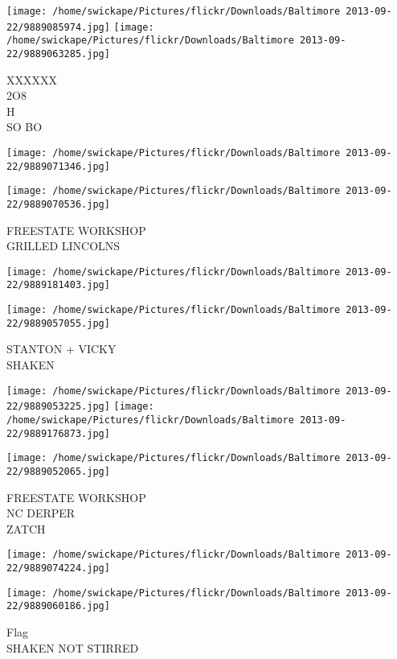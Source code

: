\documentclass[10pt,letterpaper]{article}
\begin{document}
\texttt{[image: /home/swickape/Pictures/flickr/Downloads/Baltimore 2013-09-22/9889085974.jpg]}
\texttt{[image: /home/swickape/Pictures/flickr/Downloads/Baltimore 2013-09-22/9889063285.jpg]}

XXXXXX\\
2O8\\
H\\
SO BO\\
\pagebreak

\texttt{[image: /home/swickape/Pictures/flickr/Downloads/Baltimore 2013-09-22/9889071346.jpg]}

\vspace{0.25in}
\texttt{[image: /home/swickape/Pictures/flickr/Downloads/Baltimore 2013-09-22/9889070536.jpg]}

FREESTATE WORKSHOP\\
GRILLED LINCOLNS\\
\pagebreak

\texttt{[image: /home/swickape/Pictures/flickr/Downloads/Baltimore 2013-09-22/9889181403.jpg]}

\vspace{0.25in}
\texttt{[image: /home/swickape/Pictures/flickr/Downloads/Baltimore 2013-09-22/9889057055.jpg]}

STANTON + VICKY\\
SHAKEN\\
\pagebreak

\texttt{[image: /home/swickape/Pictures/flickr/Downloads/Baltimore 2013-09-22/9889053225.jpg]}
\texttt{[image: /home/swickape/Pictures/flickr/Downloads/Baltimore 2013-09-22/9889176873.jpg]}

\texttt{[image: /home/swickape/Pictures/flickr/Downloads/Baltimore 2013-09-22/9889052065.jpg]}

FREESTATE WORKSHOP\\
NC DERPER\\
ZATCH\\
\pagebreak

\texttt{[image: /home/swickape/Pictures/flickr/Downloads/Baltimore 2013-09-22/9889074224.jpg]}

\vspace{0.25in}
\texttt{[image: /home/swickape/Pictures/flickr/Downloads/Baltimore 2013-09-22/9889060186.jpg]}

Flag\\
SHAKEN NOT STIRRED\\
\pagebreak
\end{document}
